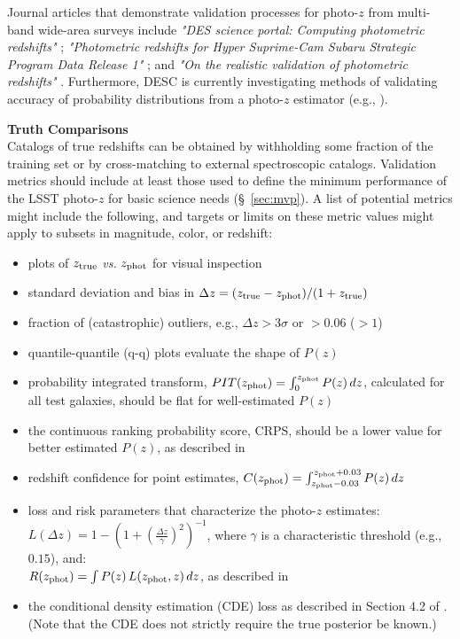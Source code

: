 \documentclass[DM,lsstdraft,toc]{lsstdoc}
\begin{document}
Journal articles that demonstrate validation processes for photo-$z$ from multi-band wide-area surveys include {\it "DES science portal: Computing photometric redshifts"} \citep{2018A&C....25...58G}; {\it "Photometric redshifts for Hyper Suprime-Cam Subaru Strategic Program Data Release 1"} \citep{2018PASJ...70S...9T}; and {\it "On the realistic validation of photometric redshifts"} \citep{2017MNRAS.468.4323B}. Furthermore, DESC is currently investigating methods of validating accuracy of probability distributions from a photo-$z$ estimator (e.g., \citealt{2020arXiv200103621S}).

{\bf Truth Comparisons}\\
Catalogs of true redshifts can be obtained by withholding some fraction of the training set or by cross-matching to external spectroscopic catalogs. Validation metrics should include at least those used to define the minimum performance of the LSST photo-$z$ for basic science needs (\S~\ref{sec:mvp}). A list of potential metrics might include the following, and targets or limits on these metric values might apply to subsets in magnitude, color, or redshift: 
\vspace{-15pt}
\begin{itemize}
\item plots of $z_{\rm true}$ {\it vs.} $z_{\rm phot}$ for visual inspection
\item standard deviation and bias in $\Delta z = (z_{\rm true}-z_{\rm phot})/(1+z_{\rm true})$
\item fraction of (catastrophic) outliers, e.g., $\Delta z > 3\sigma$ or $>0.06$ ($>1$)
\item quantile-quantile (q-q) plots evaluate the shape of $P(z)$
\item probability integrated transform, $PIT(z_{\rm phot}) = \int_{0}^{z_{\rm phot}} P(z)\,dz$, calculated for all test galaxies, should be flat for well-estimated $P(z)$ \citep{2016arXiv160808016P}
\item the continuous ranking probability score, CRPS, should be a lower value for better estimated $P(z)$, as described in \citep{2016arXiv160808016P}
\item redshift confidence for point estimates, $C(z_{\rm phot}) = \int_{z_{\rm phot}-0.03}^{z_{\rm phot}+0.03} P(z)\,dz $
\item loss and risk parameters that characterize the photo-$z$ estimates:\\
$L(\Delta z) = 1 - \left(1+ \left(\frac{\Delta z}{\gamma} \right)^2 \right)^{-1}$, 
where $\gamma$ is a characteristic threshold (e.g., $0.15$), and:\\
$R(z_{\rm phot}) = \int P(z)\,L(z_{\rm phot},z)\,dz$, as described in \citet{2018PASJ...70S...9T}
\item the conditional density estimation (CDE) loss as described in Section 4.2 of \citet{2020arXiv200103621S}. (Note that the CDE does not strictly require the true posterior be known.)
\end{itemize}
\end{document}
